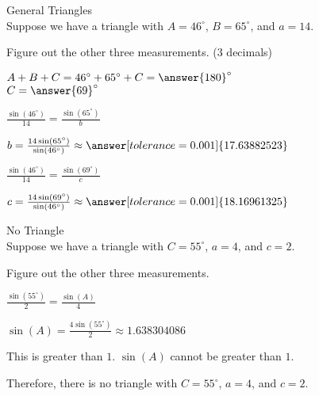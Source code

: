 \documentclass{ximera}
\begin{document}
\begin{example}  General Triangles \\

Suppose we have a triangle with $A=46^{\circ}$, $B=65^{\circ}$, and $a=14$.

Figure out the other three measurements. (3 decimals)


\begin{explanation}

$A + B + C = 46^{\circ} + 65^{\circ} + C = \answer{180}^{\circ}$ \\

$C = \answer{69}^{\circ}$


$\frac{\sin(46^{\circ})}{14} = \frac{\sin(65^{\circ})}{b}$

$b = \frac{14 \sin(65^{\circ})}{\sin(46^{\circ})} \approx \answer[tolerance=0.001]{17.63882523}$

$\frac{\sin(46^{\circ})}{14} = \frac{\sin(69^{\circ})}{c}$

$c = \frac{14 \sin(69^{\circ})}{\sin(46^{\circ})} \approx \answer[tolerance=0.001]{18.16961325}$

\end{explanation}


\end{example}












\begin{example}  No Triangle \\

Suppose we have a triangle with $C=55^{\circ}$, $a=4$, and $c=2$.

Figure out the other three measurements.


\begin{explanation}


$\frac{\sin(55^{\circ})}{2} = \frac{\sin(A)}{4}$

$\sin(A) = \frac{4 \sin(55^{\circ})}{2} \approx 1.638304086$

This is greater than $1$. $\sin(A)$ cannot be greater than $1$.

Therefore, there is no triangle with $C=55^{\circ}$, $a=4$, and $c=2$. 

\end{explanation}


\end{example}
\end{document}
